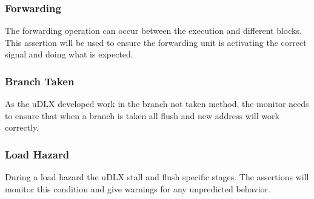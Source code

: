 \documentclass{article}
\begin{document}
	\subsubsection{Forwarding}
	
	The forwarding operation can occur between the execution and different blocks. This assertion will be used to ensure the forwarding unit is activating the correct signal and doing what is expected.
	
	\subsubsection{Branch Taken}
	
	As the uDLX developed work in the branch not taken method, the monitor needs to ensure that when a branch is taken all flush and new address will work correctly.
	
	\subsubsection{Load Hazard}

	During a load hazard the uDLX stall and flush specific stages. The assertions will monitor this condition and give warnings for any unpredicted behavior.	
	
\end{document}
